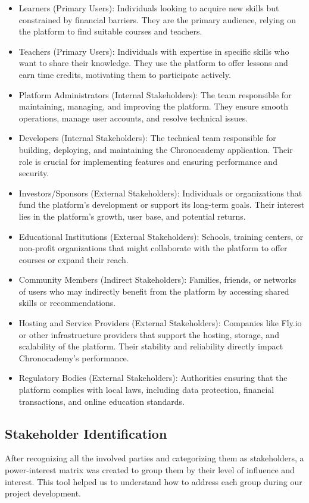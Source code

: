 \begin{itemize}
\item Learners (Primary Users): Individuals looking to acquire new skills but constrained by financial barriers.
They are the primary audience, relying on the platform to find suitable courses and teachers.
\item Teachers (Primary Users): Individuals with expertise in specific skills who want to share their knowledge.
They use the platform to offer lessons and earn time credits, motivating them to participate actively.
\item Platform Administrators (Internal Stakeholders): The team responsible for maintaining, managing, and improving the platform.
They ensure smooth operations, manage user accounts, and resolve technical issues.
\item Developers (Internal Stakeholders): The technical team responsible for building, deploying, and maintaining the Chronocademy application.
Their role is crucial for implementing features and ensuring performance and security.
\item Investors/Sponsors (External Stakeholders): Individuals or organizations that fund the platform’s development or support its long-term goals.
Their interest lies in the platform’s growth, user base, and potential returns.
\item Educational Institutions (External Stakeholders): Schools, training centers, or non-profit organizations that might collaborate with the platform to offer courses or expand their reach.
\item Community Members (Indirect Stakeholders): Families, friends, or networks of users who may indirectly benefit from the platform by accessing shared skills or recommendations.
\item Hosting and Service Providers (External Stakeholders): Companies like Fly.io or other infrastructure providers that support the hosting, storage, and scalability of the platform.
Their stability and reliability directly impact Chronocademy’s performance.
\item Regulatory Bodies (External Stakeholders): Authorities ensuring that the platform complies with local laws, including data protection, financial transactions, and online education standards.
\end{itemize}

\subsection{Stakeholder Identification}\label{subsec:stakeholders-identification}
After recognizing all the involved parties and categorizing them as stakeholders, a power-interest matrix was created to group them by their level of influence and interest.
This tool helped us to understand how to address each group during our project development.

